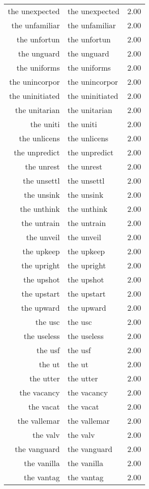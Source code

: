 \begin{table}[ht]
\begin{tabular}{rlr}
  the unexpected & the unexpected & 2.00 \\ 
  the unfamiliar & the unfamiliar & 2.00 \\ 
  the unfortun & the unfortun & 2.00 \\ 
  the unguard & the unguard & 2.00 \\ 
  the uniforms & the uniforms & 2.00 \\ 
  the unincorpor & the unincorpor & 2.00 \\ 
  the uninitiated & the uninitiated & 2.00 \\ 
  the unitarian & the unitarian & 2.00 \\ 
  the uniti & the uniti & 2.00 \\ 
  the unlicens & the unlicens & 2.00 \\ 
  the unpredict & the unpredict & 2.00 \\ 
  the unrest & the unrest & 2.00 \\ 
  the unsettl & the unsettl & 2.00 \\ 
  the unsink & the unsink & 2.00 \\ 
  the unthink & the unthink & 2.00 \\ 
  the untrain & the untrain & 2.00 \\ 
  the unveil & the unveil & 2.00 \\ 
  the upkeep & the upkeep & 2.00 \\ 
  the upright & the upright & 2.00 \\ 
  the upshot & the upshot & 2.00 \\ 
  the upstart & the upstart & 2.00 \\ 
  the upward & the upward & 2.00 \\ 
  the usc & the usc & 2.00 \\ 
  the useless & the useless & 2.00 \\ 
  the usf & the usf & 2.00 \\ 
  the ut & the ut & 2.00 \\ 
  the utter & the utter & 2.00 \\ 
  the vacancy & the vacancy & 2.00 \\ 
  the vacat & the vacat & 2.00 \\ 
  the vallemar & the vallemar & 2.00 \\ 
  the valv & the valv & 2.00 \\ 
  the vanguard & the vanguard & 2.00 \\ 
  the vanilla & the vanilla & 2.00 \\ 
  the vantag & the vantag & 2.00 \\ 

\end{tabular}
\end{table}
